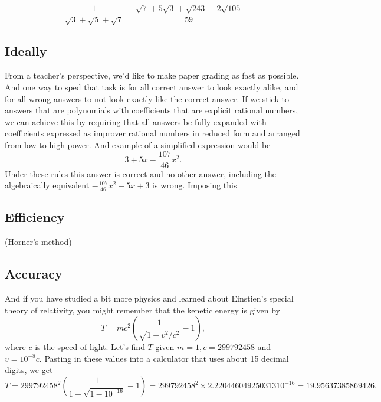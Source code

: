 \documentclass[12pt,fleqn]{article}
\begin{document}
\[
\frac{1}{\sqrt{3}+\sqrt{5} + \sqrt{7}} = \frac{\sqrt{7}+ 5 \sqrt{3} +\sqrt{243} - 2 \sqrt{105}}{59}
\]
\subsection*{Ideally}

From a teacher's perspective,  we'd like to make paper grading as fast as possible. And one way to sped that task is for all correct answer to look exactly alike, and for all wrong answers to not look exactly like the correct answer.  If we stick to answers that are polynomials with coefficients that are explicit 
rational numbers, we can achieve this by requiring that all answers be fully expanded with coefficients expressed as improver rational numbers in reduced form and arranged from low to high power.  And example of a simplified expression would be
\[
     3 + 5 x - \frac{107}{46} x^2.
\] 
Under these rules this answer is correct and no other answer, including the algebraically equivalent \( - \frac{107}{46} x^2 + 5 x + 3\) is wrong. Imposing this

\subsection*{Efficiency}

(Horner's method)

\subsection*{Accuracy} 


And if  you have studied a bit more physics and learned about Einstien's  special theory of relativity, you might remember that the kenetic energy is given by 
\[
    T  =  m c^2 \left (\frac{1}{\sqrt{1- v^2/c^2}} - 1\right),
\]
where $c$ is the speed of light.  Let's find $T$ given $m = 1, c =  299792458$ and $v= 10^{-8} c$.  Pasting in these values into a calculator that uses about 15 decimal digits, we get
\[
   T =  299792458^2 \left(\frac{1}{1 - \sqrt{1-10^{-16}}} -1 \right) = 299792458^2 \times 2.220446049250313 {{10}^{-16}} = 19.95637385869426.
\]
\end{document}
